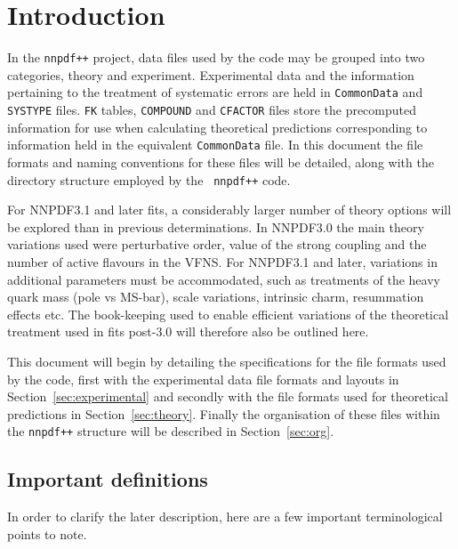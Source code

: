\documentclass[11pt]{article}
\begin{document}
\clearpage

\section{Introduction}

In the {\tt nnpdf++} project, data files used by the code may be grouped into
two categories, theory and experiment. Experimental data and the information
pertaining to the treatment of systematic errors are held in {\tt CommonData}
and {\tt SYSTYPE} files. {\tt FK} tables, {\tt COMPOUND} and {\tt CFACTOR} files
store the precomputed information for use when calculating theoretical
predictions corresponding to information held in the equivalent {\tt CommonData}
file. In this document the file formats and naming conventions for these files
will be detailed, along with the directory structure employed by the {\tt
nnpdf++} code.

For NNPDF3.1 and later fits, a considerably larger number of theory options will
be explored than in previous determinations. In NNPDF3.0 the main theory
variations used were perturbative order, value of the strong coupling and the
number of active flavours in the VFNS. For NNPDF3.1 and later, variations in
additional parameters must be accommodated, such as treatments of the heavy
quark mass (pole vs MS-bar), scale variations,  intrinsic charm, resummation
effects etc. The book-keeping used to enable efficient variations of the
theoretical treatment used in fits post-3.0 will therefore also be outlined
here.

This document will begin by detailing the specifications for the file formats
used by the code, first with the experimental data file formats and layouts in
Section~\ref{sec:experimental} and secondly with the file formats used for
theoretical predictions in Section~\ref{sec:theory}. Finally the organisation of
these files within the {\tt nnpdf++} structure will be described in
Section~\ref{sec:org}.

\subsection{Important definitions}
In order to clarify the later description, here are a few important
terminological points to note.
\end{document}
